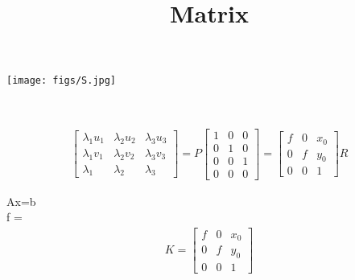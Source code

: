 \documentclass[english]{article}
\title{Matrix}
\author{\allezysissi}
\begin{document}
\begin{figure*}[h!]
    \centering
    \texttt{[image: figs/S.jpg]}

    \caption{^}
    \label{fig:S}
\end{figure*}\\
\clearpage

\begin{gather}
 \begin{bmatrix} \lambda_{1} u_{1} & \lambda_{2} u_{2} & \lambda_{3} u_{3}\\ \lambda_{1} v_{1}  & \lambda_{2} v_{2} & \lambda_{3} v_{3} \\ \lambda_{1} & \lambda_{2} & \lambda_{3}
 \end{bmatrix}
 =
 P
  \begin{bmatrix}
   1 & 0 & 0 \\  0 & 1 & 0 \\  0 & 0 & 1 \\  0 & 0 & 0
   \end{bmatrix}
 =
  \begin{bmatrix}
   f & 0 & x_{0} \\  0 & f & y_{0} \\  0 & 0 & 1
   \end{bmatrix}
   R
\end{gather}

Ax=b\\

f = \\

\begin{gather}
K 
=
\begin{bmatrix}
   f & 0 & x_{0} \\  0 & f & y_{0} \\  0 & 0 & 1 
   \end{bmatrix}
   \end{gather}
\end{document}

